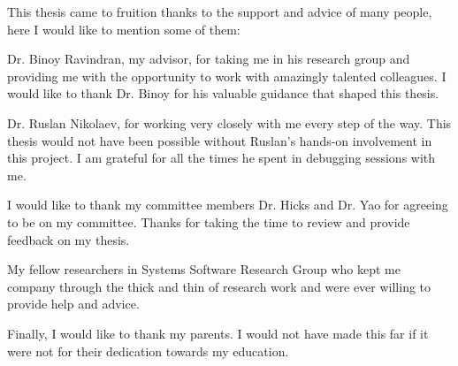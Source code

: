 This thesis came to fruition thanks to the support and advice of many people, here I would like to mention some of them:

Dr. Binoy Ravindran, my advisor, for taking me in his research group and providing me with the opportunity to work with amazingly talented colleagues. I would like to thank Dr. Binoy for his valuable guidance that shaped this thesis.

Dr. Ruslan Nikolaev, for working very closely with me every step of the way. This thesis would not have been possible without Ruslan's hands-on involvement in this project. I am grateful for all the times he spent in debugging sessions with me.

I would like to thank my committee members Dr. Hicks and Dr. Yao for agreeing to be on my committee. Thanks for taking the time to review and provide feedback on my thesis. 

My fellow researchers in Systems Software Research Group who kept me company through the thick and thin of research work and were ever willing to provide help and advice.

Finally, I would like to thank my parents. I would not have made this far if it were not for their dedication towards my education.